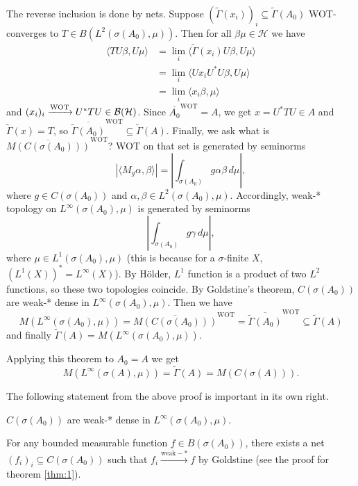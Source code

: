 \begin{myproof}
  The reverse inclusion is done by nets. Suppose $(\widetilde{\Gamma} (x_i))_i \subseteq \widetilde{\Gamma} (A_0)$
  WOT-converges to $T \in B(L^2 (\sigma(A_0), \mu))$. Then for all $\beta \mu \in \mathcal{H}$ we have 
  \begin{align*}
    \langle TU \beta, U\mu\rangle &= \lim_{i} \langle \widetilde{\Gamma} (x_i) U\beta, U\mu\rangle\\
    &= \lim_i \langle Ux_i U^* U \beta, U\mu \rangle\\
    &= \lim_i \langle x_i \beta, \mu \rangle
  \end{align*} 
  and $(x_i)_i \xrightarrow{\mathrm{WOT}} U^* T U \in \operatorname{\mathcal{B} (\mathcal{H})}$.
  Since $\overline{A_0} ^{\mathrm{WOT}} = A$, we get $x = U^* T U \in A$ and $\widetilde{\Gamma}(x) = T$, so $\overline{\widetilde{\Gamma} (A_0)}^{\mathrm{WOT}} \subseteq \widetilde{\Gamma} (A)$.
  Finally, we ask what is $\overline{M(C(\sigma(A_0)))}^{\mathrm{WOT}}$?
  WOT on that set is generated by seminorms $$|\langle M_g \alpha, \beta\rangle| = \left| \int_{\sigma(A_0)} g \alpha \beta\, d\mu \right|,$$
  where $g \in C(\sigma(A_0))$ and $\alpha, \beta \in L^2 (\sigma(A_0), \mu)$.
  Accordingly, weak-* topology on $L^\infty (\sigma(A_0), \mu)$ is generated by 
  seminorms 
  $$\left| \int_{\sigma(A_0)} g \gamma\, d\mu \right|,$$
  where $\mu \in L^1 (\sigma(A_0), \mu)$ (this is because for a $\sigma$-finite $X$, $(L^1(X))^* = L^\infty (X)$).
  By Hölder, $L^1$ function is a product of two $L^2$ functions,
  so these two topologies coincide.
  By Goldstine's theorem, $C(\sigma(A_0))$ are weak-* dense in $L^\infty (\sigma(A_0), \mu)$.
  Then we have 
  $$M(L^\infty (\sigma(A_0), \mu)) = \overline{M(C(\sigma(A_0)))}^{\mathrm{WOT}} = \overline{\widetilde{\Gamma} (A_0)}^{\mathrm{WOT}} \subseteq \widetilde{\Gamma} (A)$$
  and finally $\widetilde{\Gamma} (A) = M(L^\infty (\sigma(A_0), \mu))$.
\end{myproof}

\begin{remark}
  Applying this theorem to $A_0 = A$ we get 
  $$ M(L^{\infty} (\sigma(A), \mu)) = \widetilde{\Gamma} (A) = M(C(\sigma(A))).$$
\end{remark}

The following statement from the above proof is important in its own right.

\begin{lemma}
  $C(\sigma(A_0))$ are weak-* dense in $L^{\infty} (\sigma(A_0), \mu)$.
\end{lemma}

\begin{myproof}
  For any bounded measurable function $f \in B(\sigma(A_0))$, there exists a net $(f_i)_i \subseteq C(\sigma(A_0))$
  such that $f_i \xrightarrow{\mathrm{weak-*}} f$ by Goldstine (see the proof for theorem \ref{thm:1}).
\end{myproof}

